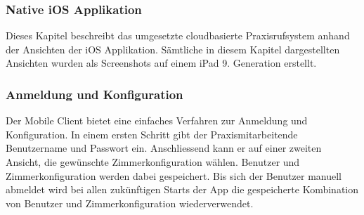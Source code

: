 \clearpage

\subsubsection{Native iOS Applikation}

Dieses Kapitel beschreibt das umgesetzte cloudbasierte Praxisrufsystem anhand der Ansichten der iOS Applikation.
Sämtliche in diesem Kapitel dargestellten Ansichten wurden als Screenshots auf einem iPad 9. Generation erstellt.

\subsubsection*{Anmeldung und Konfiguration}

Der Mobile Client bietet eine einfaches Verfahren zur Anmeldung und Konfiguration.
In einem ersten Schritt gibt der Praxismitarbeitende Benutzername und Passwort ein.
Anschliessend kann er auf einer zweiten Ansicht, die gewünschte Zimmerkonfiguration wählen.
Benutzer und Zimmerkonfiguration werden dabei gespeichert.
Bis sich der Benutzer manuell abmeldet wird bei allen zukünftigen Starts der App die gespeicherte Kombination von Benutzer und Zimmerkonfiguration wiederverwendet.


